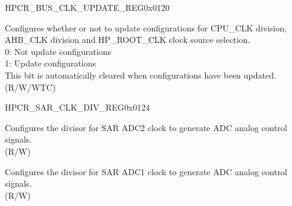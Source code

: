 \begin{register}{H}{PCR\_BUS\_CLK\_UPDATE\_REG}{0x0120}\label{regdesc:PCRBUSCLKUPDATEREG}
%
%
\regnewline%
\begin{regdesc}\begin{reglist}
\label{fielddesc:PCRBUSCLOCKUPDATE}\item [PCR\_BUS\_CLOCK\_UPDATE] Configures whether or not to update configurations for CPU\_CLK division, AHB\_CLK division and HP\_ROOT\_CLK clock source selection.\\
0: Not update configurations\\
1: Update configurations\\
This bit is automatically cleared when configurations have been updated.\\ (R/W/WTC)
\end{reglist}\end{regdesc}
\end{register}


\begin{register}{H}{PCR\_SAR\_CLK\_DIV\_REG}{0x0124}\label{regdesc:PCRSARCLKDIVREG}
%
%
%
\regnewline%
\begin{regdesc}\begin{reglist}
\label{fielddesc:PCRSAR2CLKDIVNUM}\item [PCR\_SAR2\_CLK\_DIV\_NUM] Configures the divisor for SAR ADC2  clock to generate ADC analog control signals.\\ (R/W)
\label{fielddesc:PCRSAR1CLKDIVNUM}\item [PCR\_SAR1\_CLK\_DIV\_NUM] Configures the divisor for SAR ADC1  clock to generate ADC analog control signals.\\ (R/W)
\end{reglist}\end{regdesc}
\end{register}


